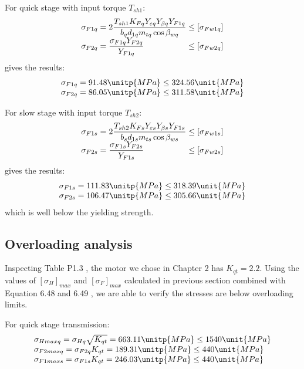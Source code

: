 For quick stage with input torque $ T_{sh1} $:
\[
\begin{array}{l@{{} \leq {}}l}
\sigma_{F1q} = 2\dfrac{T_{sh1}K_{Fq}Y_{\varepsilon q} Y_{\beta q} Y_{F1q}}{b_qd_{1q}m_{tq}\cos\beta_{wq}} & [\sigma_{Fw1q}]\\ 
\sigma_{F2q} = \dfrac{\sigma_{F1q}Y_{F2q}}{Y_{F1q}} & [\sigma_{Fw2q}]
\end{array}
\]
gives the results:
\[
\begin{array}{l@{{} \leq {}}l}
\sigma_{F1q} = 91.48 \unitp{MPa} & 324.56 \unit{MPa}\\
\sigma_{F2q} = 86.05 \unitp{MPa} & 311.58 \unit{MPa}
\end{array}
\]

For slow stage with input torque $ T_{sh2} $:
\[
\begin{array}{l@{{} \leq {}}l}
\sigma_{F1s} = 2\dfrac{T_{sh2}K_{Fs}Y_{\varepsilon s} Y_{\beta s} Y_{F1s}}{b_sd_{1s}m_{ts}\cos\beta_{ws}} & [\sigma_{Fw1s}]\\ 
\sigma_{F2s} = \dfrac{\sigma_{F1s}Y_{F2s}}{Y_{F1s}} & [\sigma_{Fw2s}]
\end{array}
\]
gives the results:
\[
\begin{array}{l@{{} \leq {}}l}
\sigma_{F1s} = 111.83 \unitp{MPa} & 318.39 \unit{MPa}\\
\sigma_{F2s} = 106.47 \unitp{MPa} & 305.66 \unit{MPa}
\end{array}
\]
which is well below the yielding strength.
\subsection{Overloading analysis}
Inspecting Table P1.3 \cite{tk1}, the motor we chose in Chapter 2 has $ K_{qt}=2.2 $. Using the values of $ [\sigma_H]_{max} $ and $ [{\sigma}_F]_{max} $ calculated in previous section combined with Equation 6.48 and 6.49 \cite{tk1}, we are able to verify the stresses are below overloading limits.

For quick stage transmission:
\[
\begin{array}{l}
\sigma_{Hmaxq}=\sigma_{Hq}\sqrt{K_{qt}} = 663.11 \unitp{MPa} \leq 1540 \unit{MPa}\\
\sigma_{F2maxq}=\sigma_{F2q}K_{qt} = 189.31 \unitp{MPa} \leq 440 \unit{MPa}\\
\sigma_{F1maxs}=\sigma_{F1s}K_{qt} = 246.03 \unitp{MPa} \leq 440 \unit{MPa}
\end{array}
\]

